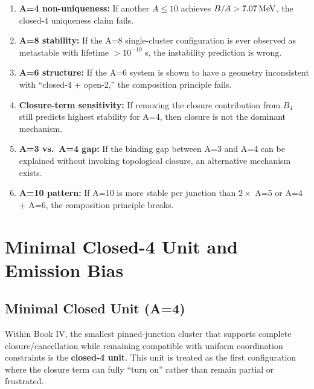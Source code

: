 \begin{edcopenbox}[title=Falsifiability Hooks]
    \begin{enumerate}
        \item \textbf{A=4 non-uniqueness:} If another $A \leq 10$ achieves
              $B/A > 7.07\,\mathrm{MeV}$, the closed-4 uniqueness claim fails.

        \item \textbf{A=8 stability:} If the A=8 single-cluster configuration
              is ever observed as metastable with lifetime $> 10^{-10}$ s,
              the instability prediction is wrong.

        \item \textbf{A=6 structure:} If the A=6 system is shown to have
              a geometry inconsistent with ``closed-4 + open-2,'' the
              composition principle fails.

        \item \textbf{Closure-term sensitivity:} If removing the closure
              contribution from $B_4$ still predicts highest stability for
              A=4, then closure is not the dominant mechanism.

        \item \textbf{A=3 vs.\ A=4 gap:} If the binding gap between A=3
              and A=4 can be explained without invoking topological closure,
              an alternative mechanism exists.

        \item \textbf{A=10 pattern:} If A=10 is more stable per junction than
              $2 \times$ A=5 or A=4 + A=6, the composition principle breaks.
    \end{enumerate}
\end{edcopenbox}

\section{Minimal Closed-4 Unit and Emission Bias}
\label{sec:light:emission}

\subsection{Minimal Closed Unit (A=4)}

Within Book IV, the smallest pinned-junction cluster that supports complete
closure/cancellation while remaining compatible with uniform coordination
constraints is the \textbf{closed-4 unit}. This unit is treated as the first
configuration where the closure term can fully ``turn on'' rather than remain
partial or frustrated. \tagP

